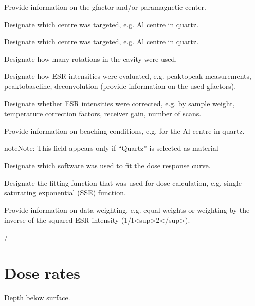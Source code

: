 \documentclass[letterpaper,10pt,english]{sphinxmanual}
\begin{document}
 \sphinxhyphen{} Provide information on the g\sphinxhyphen{}factor and/or paramagnetic center.

 \sphinxhyphen{} Designate which centre was targeted, e.g. Al centre in quartz.

 \sphinxhyphen{} Designate which centre was targeted, e.g. Al centre in quartz.

 \sphinxhyphen{} Designate how many rotations in the cavity were used.

 \sphinxhyphen{} Designate how ESR intensities were evaluated, e.g. peak\sphinxhyphen{}to\sphinxhyphen{}peak measurements, peak\sphinxhyphen{}to\sphinxhyphen{}baseline, deconvolution (provide information on the used g\sphinxhyphen{}factors).

 \sphinxhyphen{} Designate whether ESR intensities were corrected, e.g. by sample weight, temperature correction factors, receiver gain, number of scans.

 \sphinxhyphen{} Provide information on beaching conditions, e.g. for the Al centre in quartz.

\begin{sphinxadmonition}{note}{Note:}
This field appears only if “Quartz” is selected as material
\end{sphinxadmonition}

 \sphinxhyphen{} Designate which software was used to fit the dose response curve.

 \sphinxhyphen{} Designate the fitting function that was used for dose calculation, e.g. single saturating exponential (SSE) function.

 \sphinxhyphen{} Provide information on data weighting, e.g. equal weights or weighting by the inverse of the squared ESR intensity (1/I\textless{}sup\textgreater{}2\textless{}/sup\textgreater{}).

 / 


\section{Dose rates}
\label{\detokenize{ESR:dose-rates}}
 \sphinxhyphen{} Depth below surface.
\end{document}
